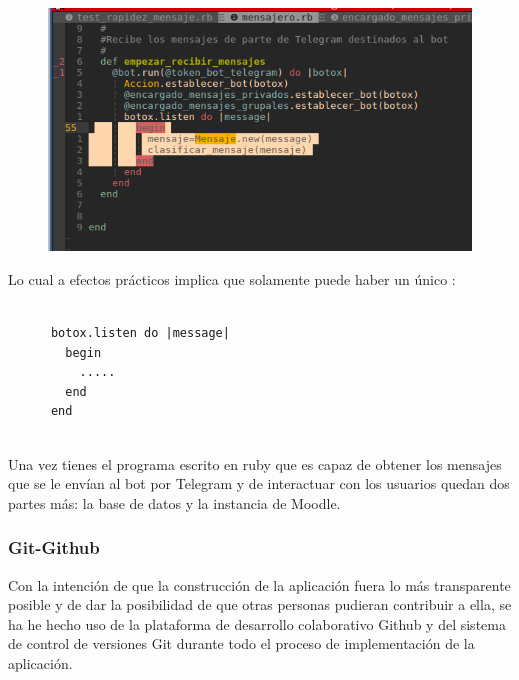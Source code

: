 \begin{figure}[H] %
\centering
\includegraphics[scale=0.7]{imagenes/random/Screenshot_2017-08-27_11-49-39.png}  %

\caption{ }\label{figura531}
\end{figure}

Lo cual a efectos prácticos implica que solamente puede haber un único :

\begin{lstlisting}

      botox.listen do |message|
        begin
          .....
        end
      end
 
\end{lstlisting}



\par 

 Una vez tienes el programa escrito en ruby que es capaz de obtener los mensajes que se le envían al bot por Telegram y de interactuar con los usuarios quedan dos partes más: la base de datos y la instancia de Moodle. 
 
 \subsubsection{Git-Github}
 
  Con la intención de que la construcción de la aplicación fuera lo más transparente posible y de dar la posibilidad de que otras personas pudieran contribuir a ella, se ha he hecho uso de la plataforma de desarrollo colaborativo Github y del sistema de control de versiones Git durante todo el proceso de implementación de la aplicación. 
  
